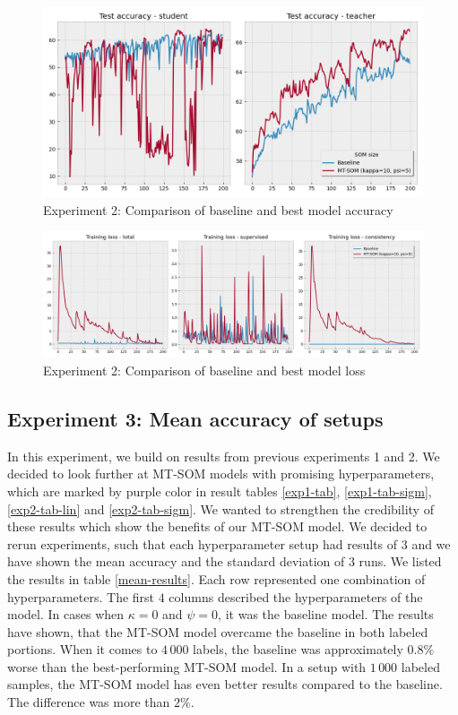 \begin{figure}[h!]
    \centering
    \includegraphics[width=0.8\linewidth]{figs/fv-som-acc-exp2.png}
    \caption{Experiment 2: Comparison of baseline and best model accuracy}
    \label{exp2-acc}
\end{figure}


\begin{figure}[h!]
    \centering
    \includegraphics[width=1\linewidth]{figs/fv-som-loss-exp2.png}
    \caption{Experiment 2: Comparison of baseline and best model loss}
    \label{exp2-loss}
\end{figure}

\subsection{Experiment 3: Mean accuracy of setups}

In this experiment, we build on results from previous experiments 1 and 2. We decided to look further at MT-SOM models with promising hyperparameters, which are marked by purple color in result tables \ref{exp1-tab}, \ref{exp1-tab-sigm}, \ref{exp2-tab-lin} and \ref{exp2-tab-sigm}. We wanted to strengthen the credibility of these results which show the benefits of our MT-SOM model. We decided to rerun experiments, such that each hyperparameter setup had results of $3$ and we have shown the mean accuracy and the standard deviation of $3$ runs. We listed the results in table \ref{mean-results}. Each row represented one combination of hyperparameters. The first $4$ columns described the hyperparameters of the model. In cases when $\kappa=0$ and $\psi=0$, it was the baseline model. The results have shown, that the MT-SOM model overcame the baseline in both labeled portions. When it comes to $4\,000$ labels, the baseline was approximately $0.8\%$ worse than the best-performing MT-SOM model. In a setup with $1\,000$ labeled samples, the MT-SOM model has even better results compared to the baseline. The difference was more than $2\%$.


